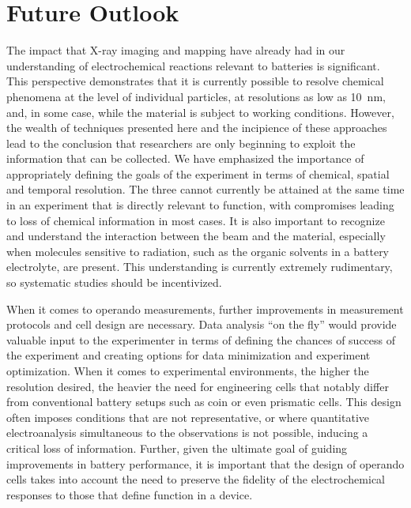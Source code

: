 \documentclass[journal=cmatex,manuscript=perspective]{achemso}
\begin{document}
\section{Future Outlook}

The impact that X-ray imaging and mapping have already had in our
understanding of electrochemical reactions relevant to batteries is
significant. This perspective demonstrates that it is currently
possible to resolve chemical phenomena at the level of individual
particles, at resolutions as low as \SI{10}{nm}, and, in some case,
while the material is subject to working conditions. However, the
wealth of techniques presented here and the incipience of these
approaches lead to the conclusion that researchers are only beginning
to exploit the information that can be collected. We have emphasized
the importance of appropriately defining the goals of the experiment
in terms of chemical, spatial and temporal resolution. The three
cannot currently be attained at the same time in an experiment that is
directly relevant to function, with compromises leading to loss of
chemical information in most cases. It is also important to recognize
and understand the interaction between the beam and the material,
especially when molecules sensitive to radiation, such as the organic
solvents in a battery electrolyte, are present. This understanding is
currently extremely rudimentary, so systematic studies should be
incentivized.

When it comes to operando measurements, further improvements in
measurement protocols and cell design are necessary. Data analysis ``on
the fly'' would provide valuable input to the experimenter in terms of
defining the chances of success of the experiment and creating options
for data minimization and experiment optimization. When it comes to
experimental environments, the higher the resolution desired, the
heavier the need for engineering cells that notably differ from
conventional battery setups such as coin or even prismatic cells. This
design often imposes conditions that are not representative, or where
quantitative electroanalysis simultaneous to the observations is not
possible, inducing a critical loss of information. Further, given the
ultimate goal of guiding improvements in battery performance, it is
important that the design of operando cells takes into account the
need to preserve the fidelity of the electrochemical responses
to those that define function in a device.
\end{document}
